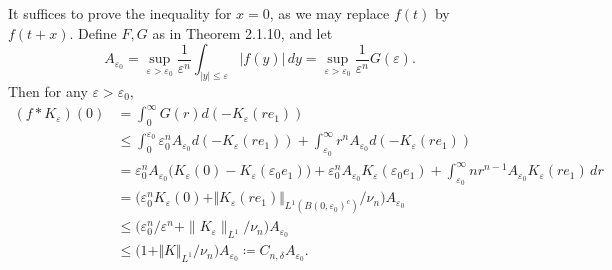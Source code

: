 \begin{itemize}
It suffices to prove the inequality for $x=0$, as we may replace $f(t)$ by $f(t+x)$. 
Define $F,G$ as in Theorem 2.1.10,  
and let 
$$A_{\varepsilon_0}=\sup_{\varepsilon>\varepsilon_0}
\frac{1}{\varepsilon^n}\int_{\vert y\vert\leq\varepsilon }\vert f(y)\vert \,dy
=\sup_{\varepsilon>\varepsilon_0}\frac{1}{\varepsilon^n}G(\varepsilon).$$ 
Then for any $\varepsilon>\varepsilon_0$,
\begin{align*}
(f*K_\varepsilon)(0)
&=\int_0^{\infty}G(r)d(-K_\varepsilon(re_1))\\
&\leq\int_0^{\varepsilon_0}\varepsilon_0^nA_{\varepsilon_0}d(-K_\varepsilon(re_1))+\int_{\varepsilon_0}^{\infty}r^nA_{\varepsilon_0}d(-K_\varepsilon(re_1))\\
&=\varepsilon_0^nA_{\varepsilon_0}\big(K_\varepsilon(0)-K_\varepsilon(\varepsilon_0e_1)\big)+\varepsilon_0^nA_{\varepsilon_0}K_\varepsilon(\varepsilon_0e_1)+\int_{\varepsilon_0}^{\infty}nr^{n-1}A_{\varepsilon_0}K_\varepsilon(re_1)\,dr\\
&=\big(\varepsilon_0^nK_\varepsilon(0)+\Vert K_\varepsilon(re_1)\Vert_{L^1(B(0,\varepsilon_0)^c)}/\nu_n\big)A_{\varepsilon_0}\\
&\leq \big(\varepsilon_0^n/\varepsilon^n+\|K_\varepsilon\|_{L^1}/\nu_n\big)A_{\varepsilon_0}\\
&\leq \big(1+\Vert K\Vert_{L^1}/\nu_n\big)A_{\varepsilon_0}\coloneqq C_{n,\delta}A_{\varepsilon_0}.
\end{align*}
\end{itemize}

